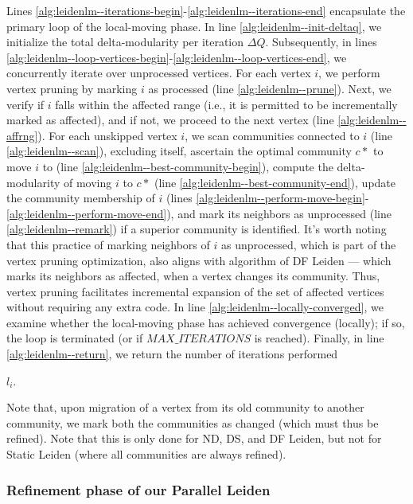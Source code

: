 Lines \ref{alg:leidenlm--iterations-begin}-\ref{alg:leidenlm--iterations-end} encapsulate the primary loop of the local-moving phase. In line \ref{alg:leidenlm--init-deltaq}, we initialize the total delta-modularity per iteration $\Delta Q$. Subsequently, in lines \ref{alg:leidenlm--loop-vertices-begin}-\ref{alg:leidenlm--loop-vertices-end}, we concurrently iterate over unprocessed vertices. For each vertex $i$, we perform vertex pruning by marking $i$ as processed (line \ref{alg:leidenlm--prune}). Next, we verify if $i$ falls within the affected range (i.e., it is permitted to be incrementally marked as affected), and if not, we proceed to the next vertex (line \ref{alg:leidenlm--affrng}). For each unskipped vertex $i$, we scan communities connected to $i$ (line \ref{alg:leidenlm--scan}), excluding itself, ascertain the optimal community $c*$ to move $i$ to (line \ref{alg:leidenlm--best-community-begin}), compute the delta-modularity of moving $i$ to $c*$ (line \ref{alg:leidenlm--best-community-end}), update the community membership of $i$ (lines \ref{alg:leidenlm--perform-move-begin}-\ref{alg:leidenlm--perform-move-end}), and mark its neighbors as unprocessed (line \ref{alg:leidenlm--remark}) if a superior community is identified. It's worth noting that this practice of marking neighbors of $i$ as unprocessed, which is part of the vertex pruning optimization, also aligns with algorithm of DF Leiden --- which marks its neighbors as affected, when a vertex changes its community. Thus, vertex pruning facilitates incremental expansion of the set of affected vertices without requiring any extra code. In line \ref{alg:leidenlm--locally-converged}, we examine whether the local-moving phase has achieved convergence (locally); if so, the loop is terminated (or if $MAX\_ITERATIONS$ is reached). Finally, in line \ref{alg:leidenlm--return}, we return the number of iterations performed $l_i$.

Note that, upon migration of a vertex from its old community to another community, we mark both the communities as changed (which must thus be refined). Note that this is only done for ND, DS, and DF Leiden, but not for Static Leiden (where all communities are always refined).


\subsubsection{Refinement phase of our Parallel Leiden}

